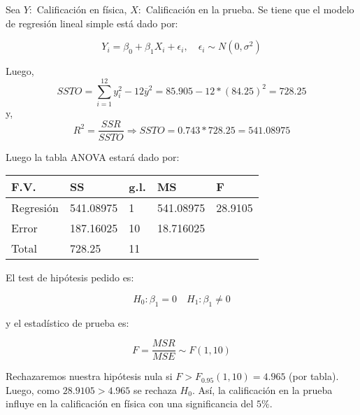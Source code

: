 \begin{solution}
Sea $Y:$ Calificación en física, $X:$ Calificación en la prueba. Se tiene que el modelo de regresión lineal simple está dado por:

$$Y_i=\beta_0+\beta_1 X_i +\epsilon_i,\quad \epsilon_i\sim N(0,\sigma^2)$$

Luego,
$$SSTO=\sum_{i=1}^{12}y_{i}^{2} - 12 \overline{y}^2 = 85.905 - 12 * (84.25)^2=728.25$$
y,
$$R^2=\dfrac{SSR}{SSTO}\Rightarrow SSTO = 0.743 * 728.25 = 541.08975$$

Luego la tabla ANOVA estará dado por:


\begin{center}
\begin{tabular}{|l|l|l|l|l|}
\hline 
F.V.     & SS        & g.l. & MS        & F       \\
\hline
Regresión & 541.08975 & 1    & 541.08975 & 28.9105 \\
Error     & 187.16025 & 10   & 18.716025 &         \\
\hline
Total     & 728.25    & 11   &           &        \\
\hline
\end{tabular}

\end{center}

El test de hipótesis pedido es:

$$H_0: \beta_1=0 \quad H_1: \beta_1 \neq 0$$

y el estadístico de prueba es:

$$F=\dfrac{MSR}{MSE} \sim F(1,10)$$

Rechazaremos nuestra hipótesis nula si $F > F_{0.95}(1,10)=4.965$ (por tabla). Luego, como $28.9105 > 4.965$ se rechaza $H_0$. Así, la calificación en la prueba influye en la calificación en física con una significancia del $5\%$.


\end{solution}